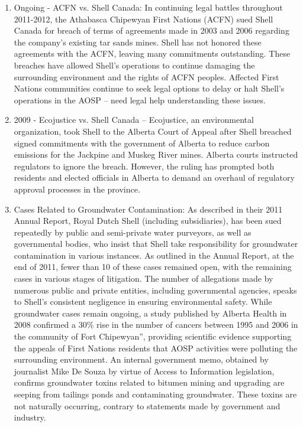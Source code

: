 \begin{enumerate}
	\item Ongoing - ACFN vs. Shell Canada: In continuing legal battles throughout 2011-2012, the Athabasca Chipewyan First Nations (ACFN) sued Shell Canada for breach of terms of agreements made in 2003 and 2006 regarding the company’s existing tar sands mines. Shell has not honored these agreements with the ACFN, leaving many commitments outstanding. These breaches have allowed Shell’s operations to continue damaging the surrounding environment and the rights of ACFN peoples. Affected First Nations communities continue to seek legal options to delay or halt Shell’s operations in the AOSP – need legal help understanding these issues.
	\item 2009 - Ecojustice vs. Shell Canada – Ecojustice, an environmental organization, took Shell to the Alberta Court of Appeal after Shell breached signed commitments with the government of Alberta to reduce carbon emissions for the Jackpine and Muskeg River mines. Alberta courts instructed regulators to ignore the breach. However, the ruling has prompted both residents and elected officials in Alberta to demand an overhaul of regulatory approval processes in the province. 
	\item Cases Related to Groundwater Contamination: As described in their 2011 Annual Report, Royal Dutch Shell (including subsidiaries), has been sued repeatedly by public and semi-private water purveyors, as well as governmental bodies, who insist that Shell take responsibility for groundwater contamination in various instances.  As outlined in the Annual Report, at the end of 2011, fewer than 10 of these cases remained open, with the remaining cases in various stages of litigation. The number of allegations made by numerous public and private entities, including governmental agencies, speaks to Shell’s consistent negligence in ensuring environmental safety. While groundwater cases remain ongoing, a study published by Alberta Health in 2008 confirmed a 30\% rise in the number of cancers between 1995 and 2006 in the community of Fort Chipewyan”,  providing scientific evidence supporting the appeals of First Nations residents that AOSP activities were polluting the surrounding environment.  An internal government memo, obtained by journalist Mike De Souza by virtue of Access to Information legislation, confirms groundwater toxins related to bitumen mining and upgrading are seeping from tailings ponds and contaminating groundwater. These toxins are not naturally occurring, contrary to statements made by government and industry.
\end{enumerate}
